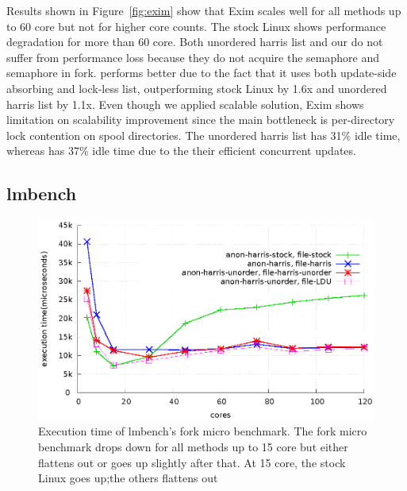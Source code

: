 Results shown in Figure~\ref{fig:exim} show that Exim scales well for all
methods up to 60 core but not for higher core counts.
The stock Linux shows performance degradation for more than 60 core.
Both unordered harris list
and our  do not suffer from performance loss 
because they do not acquire the 
semaphore and  semaphore in fork.
 performs better due to the fact that it uses both update-side
absorbing and lock-less list, outperforming stock Linux by 1.6x and unordered
harris list by 1.1x.
Even though we applied scalable solution, Exim shows limitation on scalability
improvement
since the main bottleneck is per-directory lock contention on spool
directories.
The unordered harris list has 31\% idle time, whereas  has 37\% idle
time due to the their efficient concurrent updates.



\subsection{lmbench}


\begin{figure}[tb]
  \begin{center}
    \includegraphics[scale=0.65]{graph/lmbench.eps}
  \end{center}
  \caption{Execution time of lmbench's fork micro benchmark. The fork micro
  benchmark drops down for all methods up to 15 core but either flattens out or
  goes up slightly after that. At 15 core, the stock Linux goes up;the others
  flattens out}
  \label{fig:MicroBench}
\end{figure}

